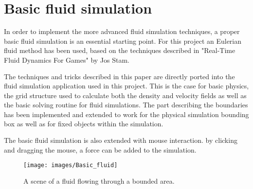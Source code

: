 \chapter{Basic fluid simulation}

In order to implement the more advanced fluid simulation techniques, a proper basic fluid simulation is an essential starting point. For this project an Eulerian fluid method has been used, based on the techniques described in "Real-Time Fluid Dynamics For Games" by Jos Stam. 

The techniques and tricks described in this paper are directly ported into the fluid simulation application used in this project. This is the case for basic physics, the grid structure used to calculate both the density and velocity fields as well as the basic solving routine for fluid simulations. The part describing the boundaries has been implemented and extended to work for the physical simulation bounding box as well as for fixed objects within the simulation. 

The basic fluid simulation is also extended with mouse interaction. by clicking and dragging the mouse, a force can be added to the simulation.

\begin{figure}[htb!]
    \centering
    \texttt{[image: images/Basic\_fluid]}
    \caption{A scene of a fluid flowing through a bounded area.}
    \label{fig:Basic_fluid}
\end{figure}